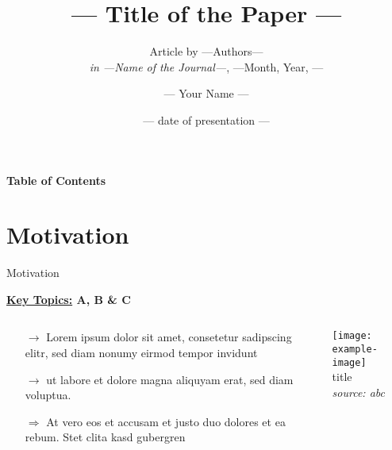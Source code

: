 \documentclass[compress, aspectratio=169, xcolor=dvipsnames]{beamer}
\author{--- Your Name ---}
\title[--- Short Title ---]{--- Title of the Paper ---}
\subtitle{{Article by ---Authors--- \\ \textit{in ---Name of the Journal---}, ---Month, Year,  ---}}
\institute{--- occasion of the event --- \\ --- Institute ---}
\date{--- date of presentation ---}
\begin{document}
	
	\begin{frame}[plain]
    	\titlepage
 	\end{frame}
 	

\addtocounter{framenumber}{-2}
 	\begin{frame}
 	\large{\textbf{Table of Contents}}
		\tableofcontents[sectionstyle=show,subsectionstyle=shaded]
	\end{frame}
	
	

\section{Motivation}
\begin{frame}{Motivation}

\textbf{\underline{Key Topics:} A, B \& C}

\begin{columns}[t]
	
\begin{column}{0.6\textwidth}

\begin{itemize}
	\item [$\rightarrow$] Lorem ipsum dolor sit amet, consetetur sadipscing elitr, sed diam nonumy eirmod tempor invidunt 
	\item [$\rightarrow$] ut labore et dolore magna aliquyam erat, sed diam voluptua.
	\item [$\Rightarrow$] At vero eos et accusam et justo duo dolores et ea rebum. Stet clita kasd gubergren
	\end{itemize}

\end{column}

\begin{column}{0.4\textwidth}
	\begin{center}
    \texttt{[image: example-image]} \\
    \scriptsize{title \\ \textit{source: abc}}
    \end{center}
\end{column}
	
\end{columns}

\end{frame}
\end{document}
